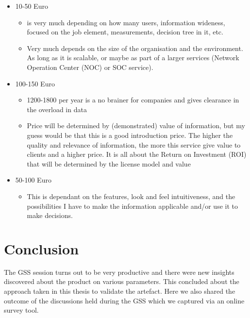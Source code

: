 \begin{itemize}
    \item 10-50 Euro
        \begin{itemize}
            \item is very much depending on how many users, 
            information wideness, 
            focused on the job element,
            measurements, 
            decision tree in it, etc.
            \item Very much depends on the size of the organisation and the environment. 
            As long as it is scalable, 
            or maybe as part of a larger services 
            (Network Operation Center (NOC) or SOC service).
        \end{itemize}
    \item 100-150 Euro
        \begin{itemize}
            \item 1200-1800 per year is a no brainer for companies and gives clearance in the overload in data
            \item Price will be determined by (demonstrated) value of information, but my guess would be that this is a good
introduction price. The higher the quality and relevance of information, the more this service give value to clients and
a higher price. It is all about the Return on Investment (ROI) that will be determined by the license model and value
        \end{itemize}
    \item 50-100 Euro
        \begin{itemize}
            \item This is dependant on the features, look and feel intuitiveness, and the possibilities I have to make the information
applicable and/or use it to make decisions.
        \end{itemize}
    
\end{itemize}



\section{Conclusion}
The GSS session turns out to be very productive and there were new insights discovered about the product on various parameters.  This concluded about the approach taken in this thesis to validate the artefact. Here we also shared the outcome of the discussions held during the GSS which we captured via an online survey tool.

